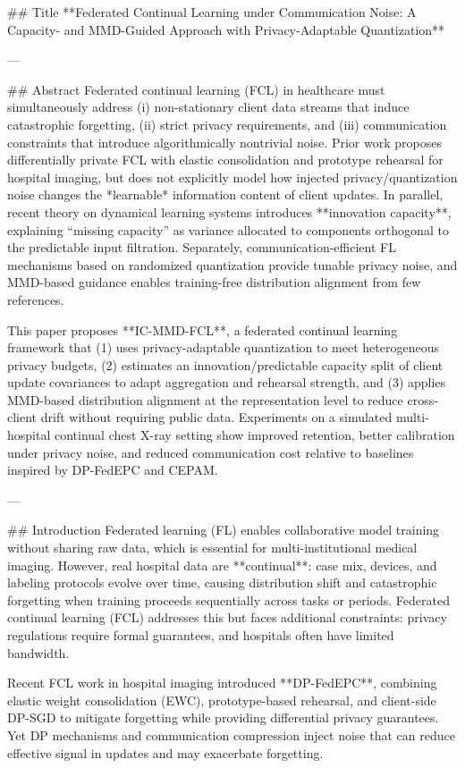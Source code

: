 ## Title  
**Federated Continual Learning under Communication Noise: A Capacity- and MMD-Guided Approach with Privacy-Adaptable Quantization**

---

## Abstract  
Federated continual learning (FCL) in healthcare must simultaneously address (i) non-stationary client data streams that induce catastrophic forgetting, (ii) strict privacy requirements, and (iii) communication constraints that introduce algorithmically nontrivial noise. Prior work proposes differentially private FCL with elastic consolidation and prototype rehearsal for hospital imaging, but does not explicitly model how injected privacy/quantization noise changes the *learnable* information content of client updates. In parallel, recent theory on dynamical learning systems introduces **innovation capacity**, explaining “missing capacity” as variance allocated to components orthogonal to the predictable input filtration. Separately, communication-efficient FL mechanisms based on randomized quantization provide tunable privacy noise, and MMD-based guidance enables training-free distribution alignment from few references.  

This paper proposes **IC-MMD-FCL**, a federated continual learning framework that (1) uses privacy-adaptable quantization to meet heterogeneous privacy budgets, (2) estimates an innovation/predictable capacity split of client update covariances to adapt aggregation and rehearsal strength, and (3) applies MMD-based distribution alignment at the representation level to reduce cross-client drift without requiring public data. Experiments on a simulated multi-hospital continual chest X-ray setting show improved retention, better calibration under privacy noise, and reduced communication cost relative to baselines inspired by DP-FedEPC and CEPAM.

---

## Introduction  
Federated learning (FL) enables collaborative model training without sharing raw data, which is essential for multi-institutional medical imaging. However, real hospital data are **continual**: case mix, devices, and labeling protocols evolve over time, causing distribution shift and catastrophic forgetting when training proceeds sequentially across tasks or periods. Federated continual learning (FCL) addresses this but faces additional constraints: privacy regulations require formal guarantees, and hospitals often have limited bandwidth.

Recent FCL work in hospital imaging introduced **DP-FedEPC**, combining elastic weight consolidation (EWC), prototype-based rehearsal, and client-side DP-SGD to mitigate forgetting while providing differential privacy guarantees. Yet DP mechanisms and communication compression inject noise that can reduce effective signal in updates and may exacerbate forgetting.

